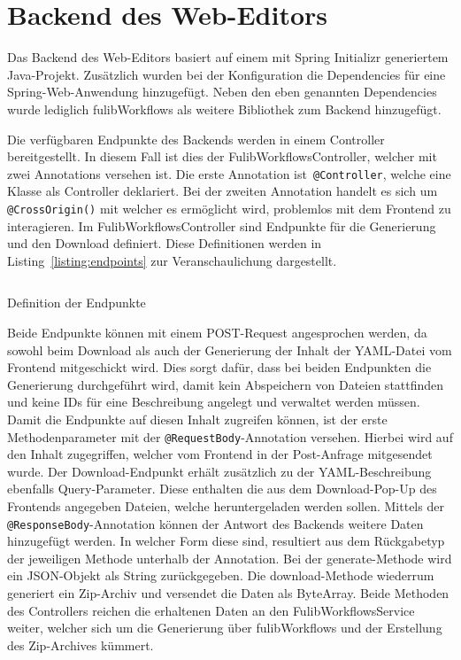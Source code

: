 \section{Backend des Web-Editors}\label{sec:editor-backend}
Das Backend des Web-Editors basiert auf einem mit Spring Initializr generiertem Java-Projekt.
Zusätzlich wurden bei der Konfiguration die Dependencies für eine Spring-Web-Anwendung hinzugefügt.
Neben den eben genannten Dependencies wurde lediglich fulibWorkflows als weitere Bibliothek zum Backend hinzugefügt.

Die verfügbaren Endpunkte des Backends werden in einem Controller bereitgestellt.
In diesem Fall ist dies der FulibWorkflowsController, welcher mit zwei Annotations versehen ist.
Die erste Annotation ist~\texttt{@Controller}, welche eine Klasse als Controller deklariert.
Bei der zweiten Annotation handelt es sich um \texttt{@CrossOrigin()} mit welcher es ermöglicht wird, problemlos mit dem
Frontend zu interagieren.
Im FulibWorkflowsController sind Endpunkte für die Generierung und den Download definiert.
Diese Definitionen werden in Listing~\ref{listing:endpoints} zur Veranschaulichung dargestellt.

\begin{listing}[!ht]
    \inputminted[firstnumber=15]{java}{listings/3.3/Endpoints.java}
    \caption{Definition der Endpunkte}
    \label{listing:endpoints}
\end{listing}

Beide Endpunkte können mit einem POST-Request angesprochen werden, da sowohl beim Download als auch der Generierung der Inhalt der
YAML-Datei vom Frontend mitgeschickt wird.
Dies sorgt dafür, dass bei beiden Endpunkten die Generierung durchgeführt wird, damit kein Abspeichern von Dateien stattfinden und keine IDs für
eine Beschreibung angelegt und verwaltet werden müssen.
Damit die Endpunkte auf diesen Inhalt zugreifen können, ist der erste Methodenparameter mit der \texttt{@RequestBody}-Annotation versehen.
Hierbei wird auf den Inhalt zugegriffen, welcher vom Frontend in der Post-Anfrage mitgesendet wurde.
Der Download-Endpunkt erhält zusätzlich zu der YAML-Beschreibung ebenfalls Query-Parameter.
Diese enthalten die aus dem Download-Pop-Up des Frontends angegeben Dateien, welche heruntergeladen werden sollen.
Mittels der \texttt{@ResponseBody}-Annotation können der Antwort des Backends weitere Daten hinzugefügt werden.
In welcher Form diese sind, resultiert aus dem Rückgabetyp der jeweiligen Methode unterhalb der Annotation.
Bei der generate-Methode wird ein JSON-Objekt als String zurückgegeben.
Die download-Methode wiederrum generiert ein Zip-Archiv und versendet die Daten als ByteArray.
Beide Methoden des Controllers reichen die erhaltenen Daten an den FulibWorkflowsService weiter, welcher sich um die Generierung über fulibWorkflows
und der Erstellung des Zip-Archives kümmert.

